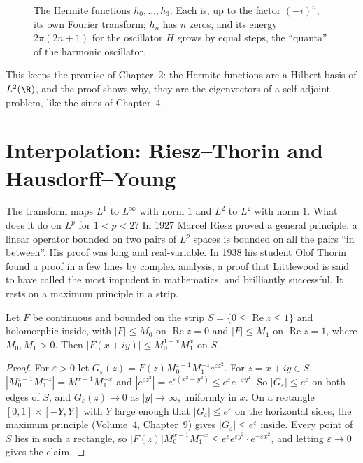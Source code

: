 \begin{figure}[ht]
\centering
{}
\caption{The Hermite functions $h_0,\dots,h_3$. Each is, up to the factor $(-i)^n$, its own Fourier transform; $h_n$ has $n$ zeros, and its energy $2\pi(2n+1)$ for the oscillator $H$ grows by equal
steps, the ``quanta'' of the harmonic oscillator.}
\label{fig:hermite}
\end{figure}

This keeps the promise of Chapter~2: the Hermite functions are a Hilbert basis of $L^2(\R)$, and the proof shows why, they are the
eigenvectors of a self-adjoint problem, like the sines of Chapter~4.

\section{Interpolation: Riesz--Thorin and Hausdorff--Young}

The transform maps $L^1$ to $L^\infty$ with norm $1$ and $L^2$ to $L^2$ with norm $1$. What does it do on $L^p$ for $1<p<2$? In 1927 Marcel Riesz proved a general principle: a linear operator bounded on two pairs of
$L^p$ spaces is bounded on all the pairs ``in between''. His proof was long and real-variable. In 1938 his student Olof Thorin found a proof in a few lines by complex analysis, a proof that Littlewood is said to have
called the most impudent in mathematics, and brilliantly successful. It rests on a maximum principle in a strip.

\begin{lemma}\label{lem:threelines}
Let $F$ be continuous and bounded on the strip $S=\{0\le\operatorname{Re}z\le1\}$ and holomorphic inside, with $|F|\le M_0$ on $\operatorname{Re}z=0$ and $|F|\le M_1$ on $\operatorname{Re}z=1$, where $M_0,M_1>0$. Then
$|F(x+iy)|\le M_0^{1-x}M_1^x$ on $S$.
\end{lemma}
\begin{proof}
For $\varepsilon>0$ let $G_\varepsilon(z)=F(z)M_0^{z-1}M_1^{-z}e^{\varepsilon z^2}$. For $z=x+iy\in S$, $|M_0^{z-1}M_1^{-z}|=M_0^{x-1}M_1^{-x}$ and $|e^{\varepsilon z^2}|=e^{\varepsilon(x^2-y^2)}\le e^\varepsilon e^{-\varepsilon y^2}$. So
$|G_\varepsilon|\le e^\varepsilon$ on both edges of $S$, and $G_\varepsilon(z)\to0$ as $|y|\to\infty$, uniformly in $x$. On a rectangle $[0,1]\times[-Y,Y]$ with $Y$ large enough that $|G_\varepsilon|\le e^\varepsilon$ on the horizontal
sides, the maximum principle (Volume~4, Chapter~9) gives $|G_\varepsilon|\le e^\varepsilon$ inside. Every point of $S$ lies in such a rectangle, so $|F(z)|M_0^{x-1}M_1^{-x}\le e^{\varepsilon}e^{\varepsilon y^2}\cdot e^{-\varepsilon x^2}$, and
letting $\varepsilon\to0$ gives the claim.
\end{proof}

